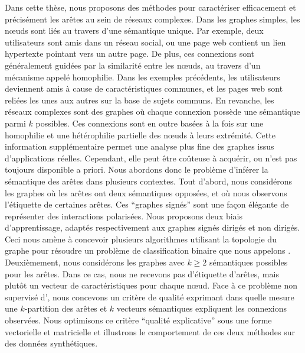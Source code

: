 Dans cette thèse, nous proposons des méthodes pour caractériser efficacement et précisément les
arêtes au sein de réseaux complexes. Dans les graphes simples, les nœuds sont liés au travers d'une
sémantique unique. Par exemple, deux utilisateurs sont amis dans un réseau social, ou une page web
contient un lien hypertexte pointant vers un autre page. De plus, ces connexions sont généralement
guidées par la similarité entre les nœuds, au travers d'un mécanisme appelé homophilie. Dans les
exemples précédents, les utilisateurs deviennent amis à cause de caractéristiques communes, et les
pages web sont reliées les unes aux autres sur la base de sujets communs. En revanche, les réseaux
complexes sont des graphes où chaque connexion possède une sémantique parmi $k$ possibles. Ces
connexions sont en outre basées à la fois sur une homophilie et une hétérophilie partielle des nœuds
à leurs extrémité. Cette information supplémentaire permet une analyse plus fine des graphes issus
d'applications réelles. Cependant, elle peut être coûteuse à acquérir, ou n'est pas toujours
disponible a priori. Nous abordons donc le problème d'inférer la sémantique des arêtes dans
plusieurs contextes. Tout d'abord, nous considérons les graphes où les arêtes ont deux sémantiques
opposées, et où nous observons l'étiquette de certaines arêtes. Ces \enquote{graphes signés} sont
une façon élégante de représenter des interactions polarisées. Nous proposons deux biais
d'apprentissage, adaptés respectivement aux graphes signés dirigés et non dirigés. Ceci nous amène à
concevoir plusieurs algorithmes utilisant la topologie du graphe pour résoudre un problème de
classification binaire que nous appelons \esp{}. Deuxièmement, nous considérons les graphes avec $k
\geq 2$ sémantiques possibles pour les arêtes. Dans ce cas, nous ne recevons pas d'étiquette
d'arêtes, mais plutôt un vecteur de caractéristiques pour chaque nœud. Face à ce problème non
supervisé d'\ecp{}, nous concevons un critère de qualité exprimant dans quelle mesure une
$k$-partition des arêtes et $k$ vecteurs sémantiques expliquent les connexions observées. Nous
optimisons ce critère \enquote{qualité explicative} sous une forme vectorielle et matricielle et
illustrons le comportement de ces deux méthodes sur des données synthétiques.
